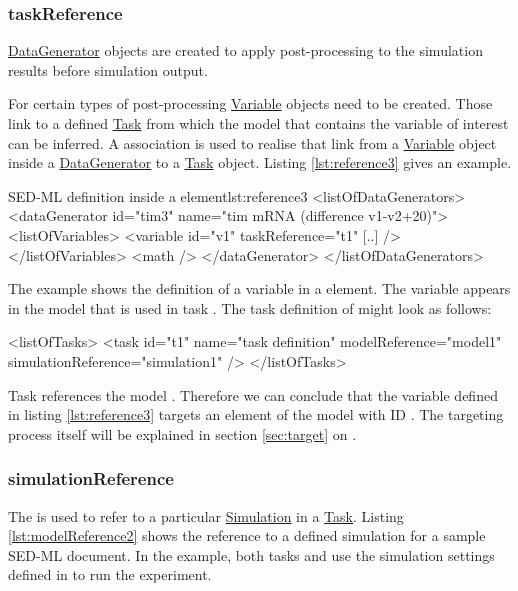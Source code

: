 \subsubsection{taskReference}
\label{sec:taskReference}
\hyperref[class:dataGenerator]{DataGenerator} objects are created to apply post-processing to the simulation results before simulation output. 

For certain types of post-processing \hyperref[class:variable]{Variable} objects need to be created. Those link to a defined \hyperref[class:task]{Task} from which the model that contains the variable of interest can be inferred. 
A  association is used to realise that link from a \hyperref[class:variable]{Variable} object inside a \hyperref[class:dataGenerator]{DataGenerator} to a \hyperref[class:task]{Task} object. 
Listing \ref{lst:reference3} gives an example.
%
\begin{myXmlLst}{SED-ML  definition inside a  element}{lst:reference3}
<listOfDataGenerators>
 <dataGenerator id="tim3" name="tim mRNA (difference v1-v2+20)">
  <listOfVariables>
   <variable id="v1" taskReference="t1" [..] />
  </listOfVariables>
  <math />
 </dataGenerator>
</listOfDataGenerators>
\end{myXmlLst}
%
The example shows the definition of a variable  in a  element. The variable appears in the model that is used in task . The task definition of  might look as follows:
\begin{myXmlLst}{}{}
<listOfTasks>
  <task id="t1" name="task definition" modelReference="model1" simulationReference="simulation1" />
</listOfTasks>
\end{myXmlLst}
Task  references the model . Therefore we can conclude that the variable  defined in listing \ref{lst:reference3} targets an element of the model with ID . The targeting process itself will be explained in section \ref{sec:target} on .

\subsubsection{simulationReference}
\label{sec:simulationReference}
The  is used to refer to a particular \hyperref[class:simulation]{Simulation} in a \hyperref[class:task]{Task}. 
Listing \ref{lst:modelReference2} shows the reference to a defined simulation for a sample SED-ML document. In the example, both tasks  and  use the simulation settings defined in  to run the experiment.
